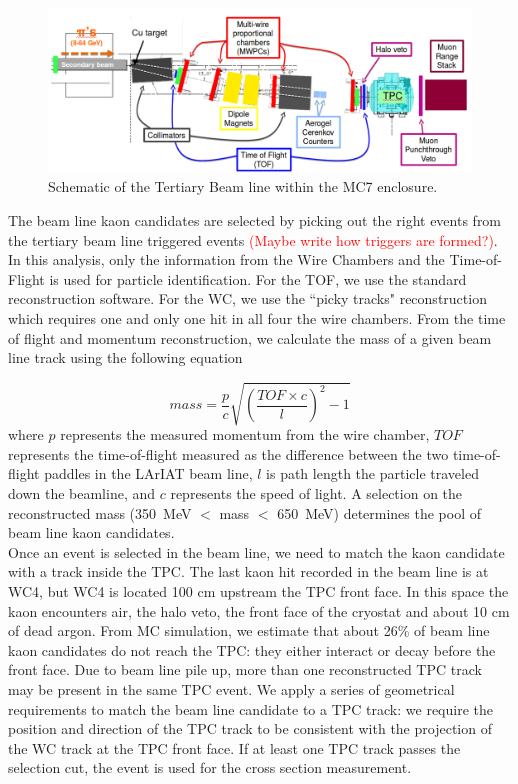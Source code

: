 \begin{figure}[htb]
\begin{center}
\includegraphics[scale=0.25]{./images/mc7beamline.png}
\end{center}
\caption{Schematic of the Tertiary Beam line within the MC7 enclosure.}
\label{fig:beamlineschematic}
\end{figure}

The beam line kaon candidates are selected by picking out the right events from the tertiary beam line triggered events \textcolor{red}{(Maybe write how triggers are formed?)}.
In this analysis, only the information from the Wire Chambers and the Time-of-Flight is used for particle identification. For the TOF, we use the standard reconstruction software. For the WC, we use the ``picky tracks" reconstruction which requires one and only one hit in all four the wire chambers. From the time of flight and momentum reconstruction, we calculate the mass of a given beam line track using the following equation

\begin{equation}
mass = \frac{p}{c}\sqrt{(\frac{TOF \times c}{l})^2 -1}
\end{equation}
where $p$ represents the measured momentum from the wire chamber, $TOF$ represents the time-of-flight measured as the difference between the two time-of-flight paddles in the LArIAT beam line, $l$ is path length the particle traveled down the beamline, and $c$ represents the speed of light. A selection on the reconstructed mass (350~MeV $<$ mass $<$ 650~MeV) determines the pool of beam line kaon candidates. \\
Once an event is selected in the beam line, we need to match the kaon candidate with a track inside the TPC. 
The last kaon hit recorded in the beam line is at WC4, but WC4 is located 100 cm upstream the TPC front face. In this space the kaon encounters air, the halo veto, the front face of the cryostat and about 10 cm of dead argon. From MC simulation, we estimate that about 26\% of beam line kaon candidates do not reach the TPC: they either interact or decay before the front face. Due to beam line pile up, more than one reconstructed TPC track may be present in the same TPC event. We apply a series of geometrical requirements to match the beam line candidate to a TPC track: we require the position and direction of the TPC track to be consistent with the projection of the WC track at the TPC  front face. If at least one TPC track passes the selection cut, the event is used for the cross section measurement.

